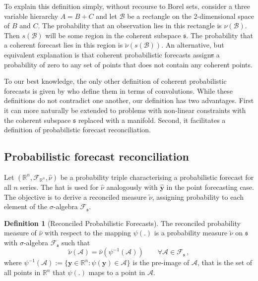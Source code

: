 \documentclass[a4paper,12pt]{article}
\theoremstyle{definition}
\newtheorem{definition}{Definition}[section]
\begin{document}
{\color{red} To explain this definition simply, without recourse to Borel sets, consider a three variable hierarchy $A=B+C$ and let $\mathcal{B}$ be a rectangle on the 2-dimensional space of $B$ and $C$. The probability that an observation lies in this rectangle is $\nu(\mathcal{B})$. Then $s(\mathcal{B})$ will be some region in the coherent subspace $\mathfrak{s}$. The probability that a coherent forecast lies in this region is $\breve{\nu}(s(\mathcal{B}))$. An alternative, but equivalent explanation is that coherent probabilistic forecasts assign\sout{s} a probability of zero to any set of points that does not contain any coherent points.}

To our best knowledge, the only other definition of coherent probabilistic forecasts is given by \cite{Taieb2017} who define them in terms of convolutions. While these definitions do not contradict one another, our definition has two advantages. First it can more naturally be extended to problems with non-linear constraints with the coherent subspace $\mathfrak{s}$ replaced with a manifold. Second, it facilitates a definition of probabilistic forecast reconciliation.

\subsection{Probabilistic forecast reconciliation}

Let $(\mathbb{R}^n, \mathscr{F}_{\mathbb{R}^n}, \hat{\nu})$ be a probability triple characterising a probabilistic forecast for all $n$ series. The hat is used for $\hat{\nu}$ analogously with $\hat{\bm{y}}$ in the point forecasting case. The objective is to derive a reconciled measure $\tilde{\nu}$, assigning probability to each element of the $\sigma$-algebra $\mathscr{F}_\mathfrak{s}$.

\begin{definition}[Reconciled Probabilistic Forecasts] \label{def:reconprob}
	The reconciled probability measure of $\hat{\nu}$ with respect to the mapping $\psi(.)$ is a probability measure $\tilde{\nu}$ on $\mathfrak{s}$ with $\sigma$-algebra $\mathscr{F}_\mathfrak{s}$ such that
	\[
	\tilde{\nu}(\mathcal{A}) = \hat{\nu}(\psi^{-1}(\mathcal{A})) \qquad \forall \mathcal{A} \in \mathscr{F}_{\mathfrak{s}}\,,
	\]
	where $\psi^{-1}(\mathcal{A}):=\{{\bm{y}}\in \mathbb{R}^n:\psi({\bm{y}})\in \mathcal{A}\}$ is the pre-image of $\mathcal{A}$, that is the set of all points in $\mathbb{R}^n$ that $\psi(.)$ maps to a point in $\mathcal{A}$.
\end{definition}
\end{document}
